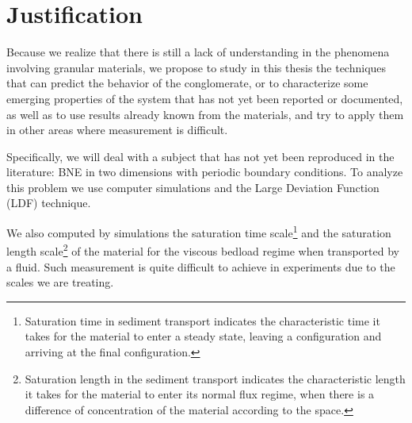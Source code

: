 \section{Justification}
\label{sec:justificativa}

    
    Because we realize that there is still a lack of understanding in the phenomena involving granular materials, we propose to study in this thesis the techniques that can predict the behavior of the conglomerate, or to characterize some emerging properties of the system that has not yet been reported or documented, as well as to use results already known from the materials, and try to apply them in other areas where measurement is difficult.


    Specifically, we will deal with a subject that has not yet been reproduced in the literature: BNE in two dimensions with periodic boundary conditions. To analyze this problem we use computer simulations and the Large Deviation Function (LDF) \cite{Large_Deviations_in_Physics} technique.


    We also computed by simulations the saturation time scale\footnote{Saturation time in sediment transport indicates the characteristic time it takes for the material to enter a steady state, leaving a configuration and arriving at the final configuration.} and the saturation length scale\footnote{Saturation length in the sediment transport indicates the characteristic length it takes for the material to enter its normal flux regime, when there is a difference of concentration of the material according to the space.} of the material for the viscous bedload regime when transported by a fluid. Such measurement is quite difficult to achieve in experiments due to the scales we are treating.

